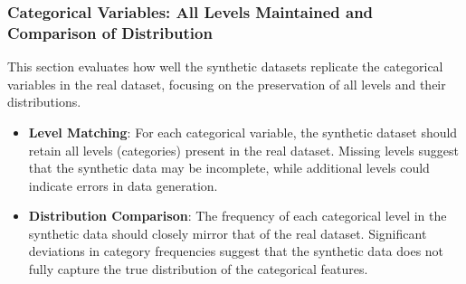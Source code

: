 \documentclass[
  letterpaper,
  DIV=11,
  numbers=noendperiod]{scrartcl}
\begin{document}
\subsubsection{Categorical Variables: All Levels Maintained and
Comparison of
Distribution}\label{categorical-variables-all-levels-maintained-and-comparison-of-distribution}

This section evaluates how well the synthetic datasets replicate the
categorical variables in the real dataset, focusing on the preservation
of all levels and their distributions.

\begin{itemize}
\item
  \textbf{Level Matching}: For each categorical variable, the synthetic
  dataset should retain all levels (categories) present in the real
  dataset. Missing levels suggest that the synthetic data may be
  incomplete, while additional levels could indicate errors in data
  generation.
\item
  \textbf{Distribution Comparison}: The frequency of each categorical
  level in the synthetic data should closely mirror that of the real
  dataset. Significant deviations in category frequencies suggest that
  the synthetic data does not fully capture the true distribution of the
  categorical features.
\end{itemize}
\end{document}
